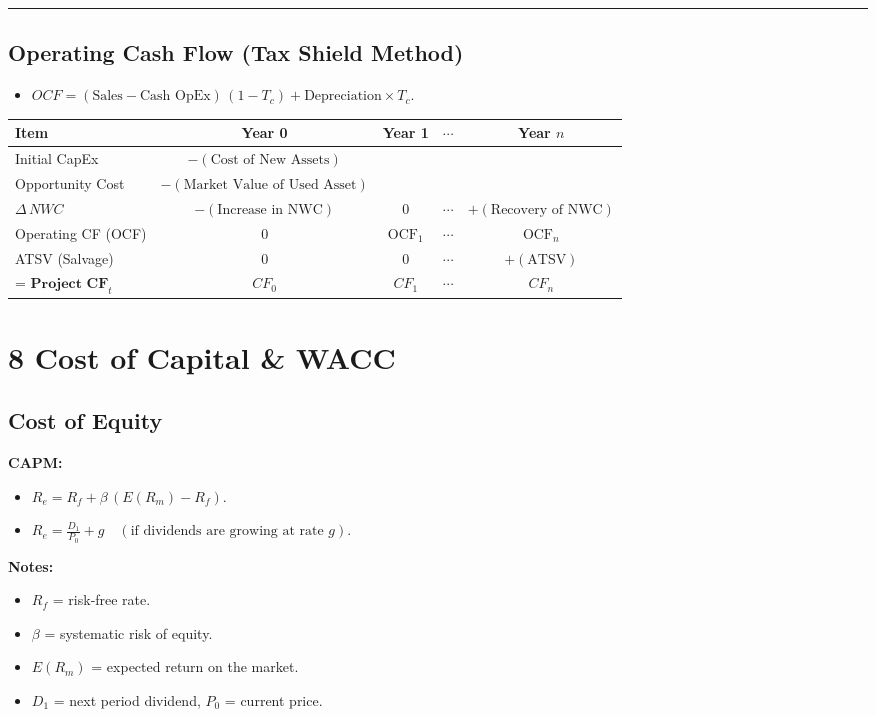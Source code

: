 \documentclass[10pt,landscape,fleqn]{article}
\begin{document}
\noindent\rule{\linewidth}{0.01pt}

\begin{multicols}{2}

\subsection*{Operating Cash Flow (Tax Shield Method)}
\begin{itemize}
  \item $OCF = (\text{Sales} - \text{Cash OpEx})\,(1 - T_c) + \text{Depreciation} \times T_c.$
\end{itemize}

\noindent\begin{tabular}{l|cccc}
\toprule
\textbf{Item} & \textbf{Year 0} & \textbf{Year 1} & \(\cdots\) & \textbf{Year \(n\)} \\ \midrule
Initial CapEx & \(-(\text{Cost of New Assets})\) &  &  &  \\
Opportunity Cost & \(-(\text{Market Value of Used Asset})\) &  &  &  \\
\(\Delta\,NWC\) & \(-(\text{Increase in NWC})\) & 0 & \(\cdots\) & \(+(\text{Recovery of NWC})\) \\
Operating CF (OCF) & 0 & \(\text{OCF}_1\) & \(\cdots\) & \(\text{OCF}_n\) \\
ATSV (Salvage) & 0 & 0 & \(\cdots\) & \(+(\text{ATSV})\) \\ \midrule
\(\textbf{= Project CF}_t\) & \(CF_0\) & \(CF_1\) & \(\cdots\) & \(CF_n\) \\
\bottomrule
\end{tabular}



\section*{8 Cost of Capital \& WACC}
\begin{multicols}{2}
\subsection*{Cost of Equity}
\textbf{CAPM:}
\begin{itemize}
  \item $R_e = R_f + \beta\,(E(R_m) - R_f).$
  \item $R_e = \frac{D_1}{P_0} + g \quad (\text{if dividends are growing at rate }g).$
\end{itemize}
\textbf{Notes:}
\begin{itemize}
  \item $R_f$ = risk‐free rate.
  \item $\beta$ = systematic risk of equity.
  \item $E(R_m)$ = expected return on the market.
  \item $D_1$ = next period dividend, $P_0$ = current price.
\end{itemize}


\end{multicols}
\end{multicols}
\end{document}

